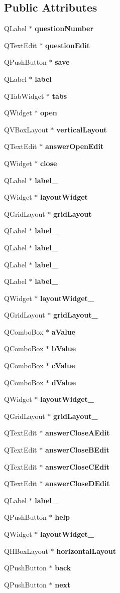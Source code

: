 \subsection*{Public Attributes}
\begin{DoxyCompactItemize}
\item 
Q\-Label $\ast$ {\bf question\-Number}
\item 
Q\-Text\-Edit $\ast$ {\bf question\-Edit}
\item 
Q\-Push\-Button $\ast$ {\bf save}
\item 
Q\-Label $\ast$ {\bf label}
\item 
Q\-Tab\-Widget $\ast$ {\bf tabs}
\item 
Q\-Widget $\ast$ {\bf open}
\item 
Q\-V\-Box\-Layout $\ast$ {\bf vertical\-Layout}
\item 
Q\-Text\-Edit $\ast$ {\bf answer\-Open\-Edit}
\item 
Q\-Widget $\ast$ {\bf close}
\item 
Q\-Label $\ast$ {\bf label\-\_}
\item 
Q\-Widget $\ast$ {\bf layout\-Widget}
\item 
Q\-Grid\-Layout $\ast$ {\bf grid\-Layout}
\item 
Q\-Label $\ast$ {\bf label\-\_}
\item 
Q\-Label $\ast$ {\bf label\-\_}
\item 
Q\-Label $\ast$ {\bf label\-\_}
\item 
Q\-Label $\ast$ {\bf label\-\_}
\item 
Q\-Widget $\ast$ {\bf layout\-Widget\-\_}
\item 
Q\-Grid\-Layout $\ast$ {\bf grid\-Layout\-\_}
\item 
Q\-Combo\-Box $\ast$ {\bf a\-Value}
\item 
Q\-Combo\-Box $\ast$ {\bf b\-Value}
\item 
Q\-Combo\-Box $\ast$ {\bf c\-Value}
\item 
Q\-Combo\-Box $\ast$ {\bf d\-Value}
\item 
Q\-Widget $\ast$ {\bf layout\-Widget\-\_}
\item 
Q\-Grid\-Layout $\ast$ {\bf grid\-Layout\-\_}
\item 
Q\-Text\-Edit $\ast$ {\bf answer\-Close\-A\-Edit}
\item 
Q\-Text\-Edit $\ast$ {\bf answer\-Close\-B\-Edit}
\item 
Q\-Text\-Edit $\ast$ {\bf answer\-Close\-C\-Edit}
\item 
Q\-Text\-Edit $\ast$ {\bf answer\-Close\-D\-Edit}
\item 
Q\-Label $\ast$ {\bf label\-\_}
\item 
Q\-Push\-Button $\ast$ {\bf help}
\item 
Q\-Widget $\ast$ {\bf layout\-Widget\-\_}
\item 
Q\-H\-Box\-Layout $\ast$ {\bf horizontal\-Layout}
\item 
Q\-Push\-Button $\ast$ {\bf back}
\item 
Q\-Push\-Button $\ast$ {\bf next}
\end{DoxyCompactItemize}


